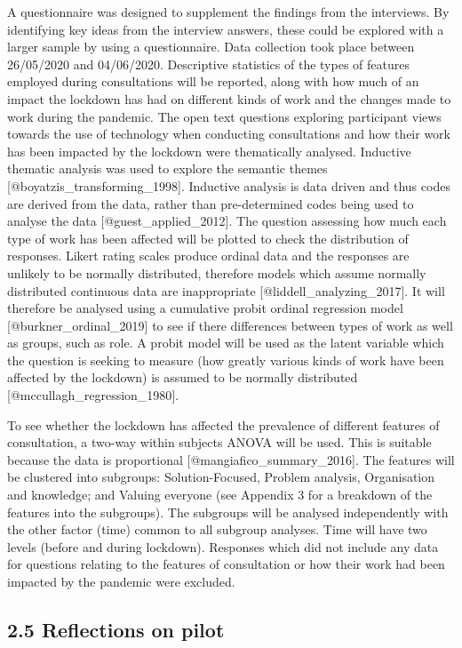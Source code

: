 \documentclass[
]{article}
\begin{document}
A questionnaire was designed to supplement the findings from the
interviews. By identifying key ideas from the interview answers, these
could be explored with a larger sample by using a questionnaire. Data
collection took place between 26/05/2020 and 04/06/2020. Descriptive
statistics of the types of features employed during consultations will
be reported, along with how much of an impact the lockdown has had on
different kinds of work and the changes made to work during the
pandemic. The open text questions exploring participant views towards
the use of technology when conducting consultations and how their work
has been impacted by the lockdown were thematically analysed. Inductive
thematic analysis was used to explore the semantic themes
{[}@boyatzis\_transforming\_1998{]}. Inductive analysis is data driven
and thus codes are derived from the data, rather than pre-determined
codes being used to analyse the data {[}@guest\_applied\_2012{]}. The
question assessing how much each type of work has been affected will be
plotted to check the distribution of responses. Likert rating scales
produce ordinal data and the responses are unlikely to be normally
distributed, therefore models which assume normally distributed
continuous data are inappropriate {[}@liddell\_analyzing\_2017{]}. It
will therefore be analysed using a cumulative probit ordinal regression
model {[}@burkner\_ordinal\_2019{]} to see if there differences between
types of work as well as groups, such as role. A probit model will be
used as the latent variable which the question is seeking to measure
(how greatly various kinds of work have been affected by the lockdown)
is assumed to be normally distributed
{[}@mccullagh\_regression\_1980{]}.

To see whether the lockdown has affected the prevalence of different
features of consultation, a two-way within subjects ANOVA will be used.
This is suitable because the data is proportional
{[}@mangiafico\_summary\_2016{]}. The features will be clustered into
subgroups: Solution-Focused, Problem analysis, Organisation and
knowledge; and Valuing everyone (see Appendix 3 for a breakdown of the
features into the subgroups). The subgroups will be analysed
independently with the other factor (time) common to all subgroup
analyses. Time will have two levels (before and during lockdown).
Responses which did not include any data for questions relating to the
features of consultation or how their work had been impacted by the
pandemic were excluded.

\hypertarget{reflections-on-pilot}{%
\subsection{2.5 Reflections on pilot}\label{reflections-on-pilot}}
\end{document}
